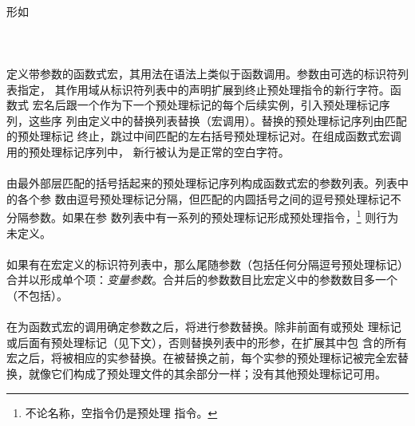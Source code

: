 {\paragraph{}
形如                                                                          \\
\mbox{\hspace{4em}  \tm{)} }           \\
\mbox{\hspace{4em}  
  }                                             \\
\mbox{\hspace{4em} 
   }                                \\
定义带参数的函数式宏，其用法在语法上类似于函数调用。参数由可选的标识符列表指定，
其作用域从标识符列表中的声明扩展到终止预处理指令的新行字符。函数式
宏名后跟一个\tm{(}作为下一个预处理标记的每个后续实例，引入预处理标记序列，这些序
列由定义中的替换列表替换（宏调用）。替换的预处理标记序列由匹配的\tm{)}预处理标记
终止，跳过中间匹配的左右括号预处理标记对。在组成函数式宏调用的预处理标记序列中，
新行被认为是正常的空白字符。

\paragraph{}
由最外部层匹配的括号括起来的预处理标记序列构成函数式宏的参数列表。列表中的各个参
数由逗号预处理标记分隔，但匹配的内圆括号之间的逗号预处理标记不分隔参数。如果在参
数列表中有一系列的预处理标记形成预处理指令，\footnote{不论名称，空指令仍是预处理
指令。} 则行为未定义。

\paragraph{}
如果有在宏定义的标识符列表中，那么尾随参数（包括任何分隔逗号预处理标记）
合并以形成单个项：\textit{变量参数}。合并后的参数数目比宏定义中的参数数目多一个
（不包括）。

\paragraph{}
在为函数式宏的调用确定参数之后，将进行参数替换。除非前面有\tm{\#}或\tm{\#\#}预处
理标记或后面有\tm{\#\#}预处理标记（见下文），否则替换列表中的形参，在扩展其中包
含的所有宏之后，将被相应的实参替换。在被替换之前，每个实参的预处理标记被完全宏替
换，就像它们构成了预处理文件的其余部分一样；没有其他预处理标记可用。

}

